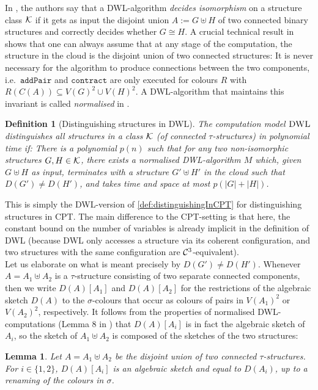 \documentclass[10pt,a4paper]{article}
\newtheorem{lemma}[theorem]{Lemma}
\newtheorem{definition}[theorem]{Definition}
\newcommand{\DWL}{\mbox{\sc DWL}}
\newcommand{\Cc}{{\cal C}}
\newcommand{\Kk}{{\cal K}}
\newcommand{\pairOp }{\texttt{addPair}}
\newcommand{\sccOp }{\texttt{contract}}
\begin{document}
	In \cite{dwl}, the authors say that a DWL-algorithm \emph{decides isomorphism} on a structure class $\Kk$ if it gets as input the disjoint union $A:= G \uplus H$ of two connected binary structures and correctly decides whether $G \cong H$. A crucial technical result in \cite{dwl} shows that one can always assume that at any stage of the computation, the structure in the cloud is the disjoint union of two connected structures: It is never necessary for the algorithm to produce connections between the two components, i.e.\ $\pairOp$ and $\sccOp$ are only executed for colours $R$ with $R(C(A)) \subseteq V(G)^2 \cup V(H)^2$. A DWL-algorithm that maintains this invariant is called \emph{normalised} in \cite{dwl}. 
	\begin{definition}[Distinguishing structures in DWL]
		\label{def:PC_distinguishInDWL}
		The computation model $\DWL$ \emph{distinguishes} all structures in a class $\Kk$ (of connected $\tau$-structures) in \emph{polynomial time} if: There is a polynomial $p(n)$ such that for any two non-isomorphic structures $G, H \in \Kk$, there exists a \emph{normalised} DWL-algorithm $M$ which, given $G\uplus H$ as input, terminates with a structure $G' \uplus H'$ in the cloud such that $D(G') \neq D(H')$, and takes time and space at most $p(|G|+|H|)$.	
	\end{definition}	
	This is simply the DWL-version of \autoref{def:distinguishingInCPT} for distinguishing structures in CPT. The main difference to the CPT-setting is that here, the constant bound on the number of variables is already implicit in the definition of DWL (because DWL only accesses a structure via its coherent configuration, and two structures with the same configuration are $\Cc^3$-equivalent).\\
	Let us elaborate on what is meant precisely by $D(G') \neq D(H')$.
	Whenever $A = A_1 \uplus A_2$ is a $\tau$-structure consisting of two separate connected components, then we write $D(A)[A_1]$ and $D(A)[A_2]$ for the restrictions of the algebraic sketch $D(A)$ to the $\sigma$-colours that occur as colours of pairs in $V(A_1)^2$ or $V(A_2)^2$, respectively. 
	It follows from the properties of normalised DWL-computations (Lemma 8 in \cite{dwl}) that $D(A)[A_i]$ is in fact the algebraic sketch of $A_i$, so the sketch of $A_1 \uplus A_2$ is composed of the sketches of the two structures:
	\begin{lemma}
		\label{lem:restrictionOfSketch}
		Let $A = A_1 \uplus A_2$ be the disjoint union of two connected $\tau$-structures. For $i \in \{1,2\}$, $D(A)[A_i]$ is an algebraic sketch and equal to $D(A_i)$, up to a renaming of the colours in $\sigma$.
	\end{lemma}  
\end{document}
